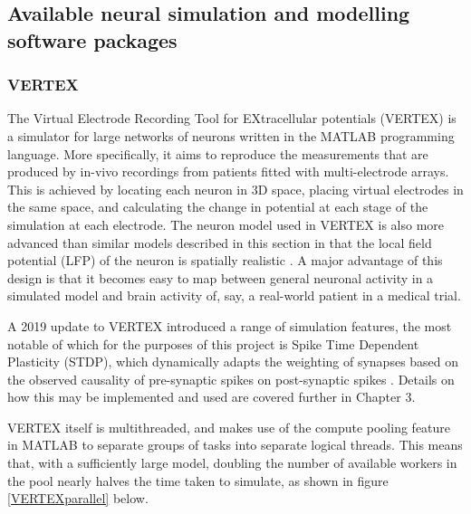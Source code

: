 \subsection{Available neural simulation and modelling software packages}

\subsubsection{VERTEX}
The Virtual Electrode Recording Tool for EXtracellular potentials (VERTEX) is a
simulator for large networks of neurons written in the MATLAB programming
language. More specifically, it aims to reproduce the measurements that are
produced by in-vivo recordings from patients fitted with multi-electrode
arrays. This is achieved by locating each neuron in 3D space, placing virtual
electrodes in the same space, and calculating the change in potential at each
stage of the simulation at each electrode. The neuron model used in VERTEX is
also more advanced than similar models described in this section in that the
local field potential (LFP) of the neuron is spatially realistic
\autocite{tomsett_virtual_2015}. A major advantage of this design is that it
becomes easy to map between general neuronal activity in a simulated model and
brain activity of, say, a real-world patient in a medical trial.

A 2019 update to VERTEX introduced a range of simulation features, the most
notable of which for the purposes of this project is Spike Time Dependent
Plasticity (STDP), which dynamically adapts the weighting of synapses based on
the observed causality of pre-synaptic spikes on post-synaptic spikes
\autocite{thornton_virtual_2019}. Details on how this may be implemented and
used are covered further in Chapter 3.

VERTEX itself is multithreaded, and makes use of the compute pooling feature in
MATLAB to separate groups of tasks into separate logical threads. This means
that, with a sufficiently large model, doubling the number of available workers
in the pool nearly halves the time taken to simulate, as shown in figure
\ref{VERTEXparallel} below.

